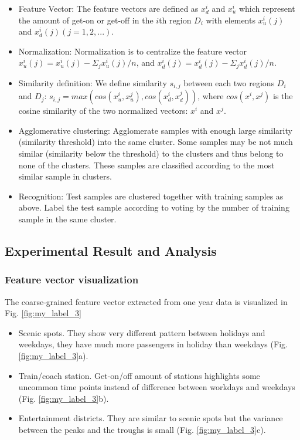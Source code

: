 \documentclass[a4paper, 10pt, conference]{ieeeconf}      %
\begin{document}
\begin{itemize}

\item Feature Vector: The feature vectors are defined as $ x^{i}_{d} $ and $ x^{i}_{u} $ which represent the amount of get-on or get-off in the $i$th region $D_i$ with elements $ x^{i}_{u}(j) $ and $ x^{i}_{d}(j) (j=1,2,...) $.
\item Normalization: Normalization is to centralize the feature vector $ x^{i}_{u}(j)=x^{i}_{u}(j)-\Sigma_{j}x^{i}_{u}(j)/n $, and $ x^{i}_{d}(j)=x^{i}_{d}(j)-\Sigma_{j}x^{i}_{d}(j)/n $.
\item Similarity definition: We define similarity $ s_{i,j} $ between each two regions $ D_i $ and $ D_j $: $ s_{i,j}=max(cos(x^{i}_{u},x^{j}_{u}),cos(x^{i}_{d},x^{j}_{d})) $, where $ cos(x^i,x^j) $ is the cosine similarity of the two normalized vectors: $ x^i $ and $ x^j $.
\item Agglomerative clustering: Agglomerate samples with enough large similarity (similarity threshold) into the same cluster. Some samples may be not much similar (similarity below the threshold) to the clusters and thus belong to none of the clusters. These samples are classified according to the most similar sample in clusters.
\item Recognition: Test samples are clustered together with training samples as above. Label the test sample according to voting by the number of training sample in the same cluster.

\end{itemize}

\subsection{Experimental Result and Analysis}

\subsubsection{Feature vector visualization}The coarse-grained feature vector extracted from one year data is visualized in Fig. \ref{fig:my_label_3}

\begin{itemize}
\item Scenic spots. They show very different pattern between holidays and weekdays, they have much more passengers in holiday than weekdays (Fig. \ref{fig:my_label_3}a).
\item Train/coach station. Get-on/off amount of stations highlights some uncommon time points instead of difference between workdays and weekdays (Fig. \ref{fig:my_label_3}b).
\item Entertainment districts. They are similar to scenic spots but the variance between the peaks and the troughs is small (Fig. \ref{fig:my_label_3}c).

\end{itemize}
\end{document}
